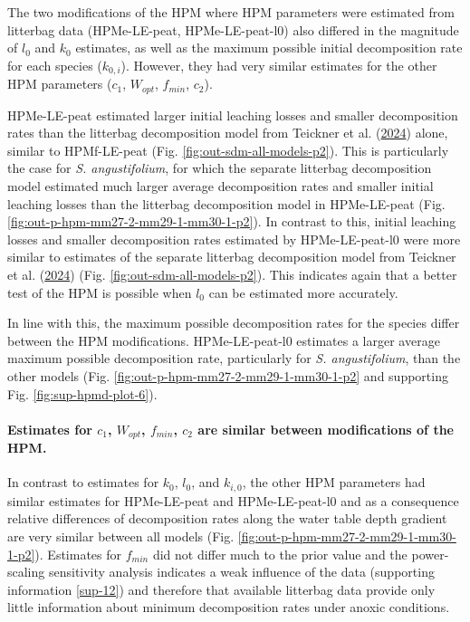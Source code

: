 \documentclass[
  12pt,
]{article}
\begin{document}
The two modifications of the HPM where HPM parameters were estimated from litterbag data (HPMe-LE-peat, HPMe-LE-peat-l0) also differed in the magnitude of \(l_0\) and \(k_0\) estimates, as well as the maximum possible initial decomposition rate for each species (\(k_{0,i}\)). However, they had very similar estimates for the other HPM parameters (\(c_1\), \(W_{opt}\), \(f_{min}\), \(c_2\)).

HPMe-LE-peat estimated larger initial leaching losses and smaller decomposition rates than the litterbag decomposition model from Teickner et al. (\protect\hyperlink{ref-Teickner.2024}{2024}) alone, similar to HPMf-LE-peat (Fig. \ref{fig:out-sdm-all-models-p2}). This is particularly the case for \emph{S. angustifolium}, for which the separate litterbag decomposition model estimated much larger average decomposition rates and smaller initial leaching losses than the litterbag decomposition model in HPMe-LE-peat (Fig. \ref{fig:out-p-hpm-mm27-2-mm29-1-mm30-1-p2}). In contrast to this, initial leaching losses and smaller decomposition rates estimated by HPMe-LE-peat-l0 were more similar to estimates of the separate litterbag decomposition model from Teickner et al. (\protect\hyperlink{ref-Teickner.2024}{2024}) (Fig. \ref{fig:out-sdm-all-models-p2}). This indicates again that a better test of the HPM is possible when \(l_0\) can be estimated more accurately.

In line with this, the maximum possible decomposition rates for the species differ between the HPM modifications. HPMe-LE-peat-l0 estimates a larger average maximum possible decomposition rate, particularly for \emph{S. angustifolium}, than the other models (Fig. \ref{fig:out-p-hpm-mm27-2-mm29-1-mm30-1-p2} and supporting Fig. \ref{fig:sup-hpmd-plot-6}).

\hypertarget{estimates-for-c_1-w_opt-f_min-c_2-are-similar-between-modifications-of-the-hpm.}{%
\paragraph*{\texorpdfstring{Estimates for \(c_1\), \(W_{opt}\), \(f_{min}\), \(c_2\) are similar between modifications of the HPM.}{Estimates for c\_1, W\_\{opt\}, f\_\{min\}, c\_2 are similar between modifications of the HPM.}}\label{estimates-for-c_1-w_opt-f_min-c_2-are-similar-between-modifications-of-the-hpm.}}

In contrast to estimates for \(k_0\), \(l_0\), and \(k_{i,0}\), the other HPM parameters had similar estimates for HPMe-LE-peat and HPMe-LE-peat-l0 and as a consequence relative differences of decomposition rates along the water table depth gradient are very similar between all models (Fig. \ref{fig:out-p-hpm-mm27-2-mm29-1-mm30-1-p2}). Estimates for \(f_{min}\) did not differ much to the prior value and the power-scaling sensitivity analysis indicates a weak influence of the data (supporting information \ref{sup-12}) and therefore that available litterbag data provide only little information about minimum decomposition rates under anoxic conditions.
\end{document}
